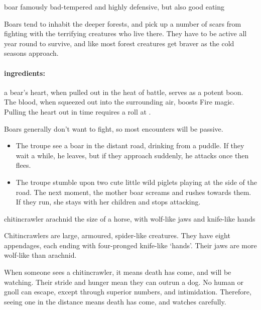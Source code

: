 \begin{multicols}{2}
  {boar}%
  {famously bad-tempered and highly defensive, but also good eating}%


Boars tend to inhabit the deeper forests, and pick up a number of scars from fighting with the terrifying creatures who live there.
They have to be active all year round to survive, and like most forest creatures get braver as the cold seasons approach.

\boar

\paragraph{\Glspl{ingredient}:}
a bear's heart, when pulled out in the heat of battle, serves as a potent \gls{boon}.
The blood, when squeezed out into the surrounding air, boosts Fire magic.
Pulling the heart out in time requires a  roll at \tn[10].

\showEnc
Boars generally don't want to fight, so most encounters will be passive.

\begin{itemize}

  \item
  The troupe see a boar in the distant road, drinking from a puddle.
  If they wait a while, he leaves, but if they approach suddenly, he attacks once then flees.
  \item
  The troupe stumble upon two cute little wild piglets playing at the side of the road.
  The next moment, the mother boar screams and rushes towards them.
  If they run, she stays with her children and stops attacking.

\end{itemize}


  {chitincrawler}%
  {arachnid the size of a horse, with wolf-like jaws and knife-like hands}%

Chitincrawlers are large, armoured, spider-like creatures.
They have eight appendages, each ending with four-pronged knife-like `hands'.
Their jaws are more wolf-like than arachnid.

When someone sees a chitincrawler, it means death has come, and will be watching.
Their stride and hunger mean they can outrun a dog.
No human or gnoll can escape, except through superior numbers, and intimidation.
Therefore, seeing one in the distance means death has come, and watches carefully.


\end{multicols}
